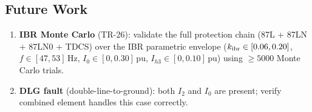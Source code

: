 \documentclass[11pt,a4paper]{article}
\begin{document}
\subsection{Future Work}

\begin{enumerate}
  \item \textbf{IBR Monte Carlo} (TR-26): validate the full protection chain
    (87L + 87LN + 87LN0 + TDCS) over the IBR parametric envelope
    ($k_{\rm ibr}\in[0.06,0.20]$, $f\in[47,53]$\,Hz, $I_0\in[0,0.30]$\,pu,
    $I_{h3}\in[0,0.10]$\,pu) using $\geq 5000$ Monte Carlo trials.
  \item \textbf{DLG fault} (double-line-to-ground): both $I_2$ and $I_0$ are
    present; verify combined element handles this case correctly.
\end{enumerate}



\end{document}
